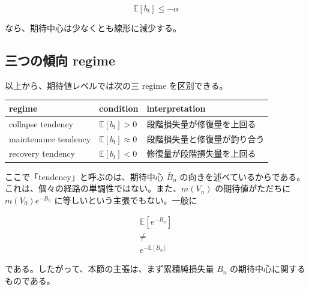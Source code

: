 \documentclass[12pt,a4paper]{article}
\begin{document}
\[
\mathbb E[b_{t}] \le -\alpha
\]

なら、期待中心は少なくとも線形に減少する。

\subsection{三つの傾向 regime}\label{ux4e09ux3064ux306eux50beux5411-regime}

以上から、期待値レベルでは次の三 regime を区別できる。

{\def\LTcaptype{table} %
\begin{longtable}[]{@{}
  >{\raggedright\arraybackslash}p{}
  >{\raggedright\arraybackslash}p{}
  >{\raggedright\arraybackslash}p{}@{}}
\toprule\noalign{}
\begin{minipage}[b]{\linewidth}\raggedright
regime
\end{minipage} & \begin{minipage}[b]{\linewidth}\raggedright
condition
\end{minipage} & \begin{minipage}[b]{\linewidth}\raggedright
interpretation
\end{minipage} \\
\midrule\noalign{}
\endhead
\bottomrule\noalign{}
\endlastfoot
collapse tendency & \(\mathbb E[b_t] > 0\) & 段階損失量が修復量を上回る \\
maintenance tendency & \(\mathbb E[b_t] \approx 0\) & 段階損失量と修復量が釣り合う \\
recovery tendency & \(\mathbb E[b_t] < 0\) & 修復量が段階損失量を上回る \\
\end{longtable}
}

ここで「tendency」と呼ぶのは、期待中心 \(\bar B_{n}\) の向きを述べているからである。これは、個々の経路の単調性ではない。また、\(m(V_{n})\) の期待値がただちに \(m(V_0)e^{-\bar B_{n}}\) に等しいという主張でもない。一般に

\[
\begin{aligned}
\mathbb E[e^{-B_{n}}] \\
\ne \\
e^{-\mathbb E[B_{n}]}
\end{aligned}
\]

である。したがって、本節の主張は、まず累積純損失量 \(B_{n}\) の期待中心に関するものである。
\end{document}
